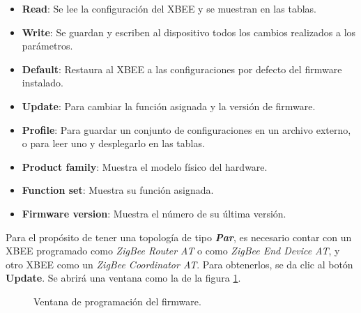 \begin{itemize}
	\item \textbf{Read}: Se lee la configuración del XBEE y se muestran en las tablas. 
	\item \textbf{Write}: Se guardan y escriben al dispositivo todos los cambios realizados a los parámetros.
	\item \textbf{Default}: Restaura al XBEE a las configuraciones por defecto del firmware instalado.
	\item \textbf{Update}: Para cambiar la función asignada y la versión de firmware.
	\item \textbf{Profile}: Para guardar un conjunto de configuraciones en un archivo externo, o para leer uno y desplegarlo en las tablas.
	\item \textbf{Product family}: Muestra el modelo físico del hardware.
	\item \textbf{Function set}: Muestra su función asignada.
	\item \textbf{Firmware version}: Muestra el número de su última versión.
\end{itemize}

Para el propósito de tener una topología de tipo \textit{\textbf{Par}}, es necesario contar con un XBEE programado como \textit{ZigBee Router AT} o como \textit{ZigBee End Device AT}, y otro XBEE como un \textit{ZigBee Coordinator AT}. Para obtenerlos, se da clic al botón \textbf{Update}. Se abrirá una ventana como la de la figura \ref{fig:Upd}.

\begin{figure}[H] %
\caption[1]{Ventana de programación del firmware.}
\label{fig:Upd}
\end{figure}

